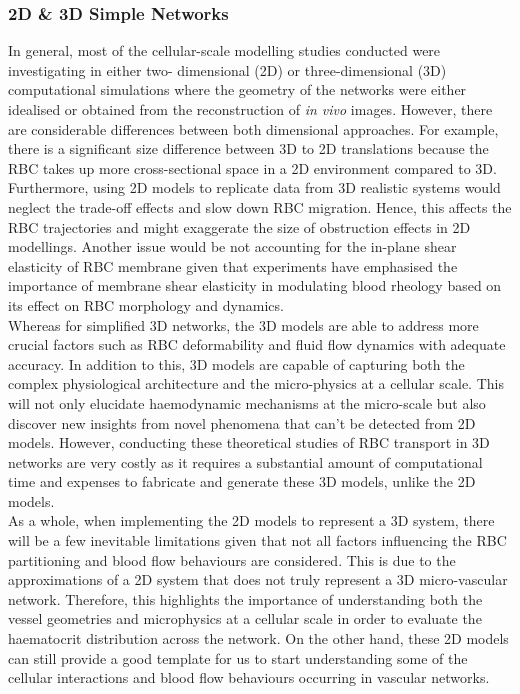 \subsubsection{2D \& 3D Simple Networks}
\noindent In general, most of the cellular-scale modelling studies conducted were investigating in either two- dimensional (2D) or three-dimensional (3D) computational simulations where the geometry of the networks were either idealised or obtained from the reconstruction of \textit{in vivo} images.\cite{PriesAR1990BFiM, reichold2011cerebral, Gould2015HematocritNetworks, Balogh2018, CharlesPhDThesis2020} However, there are considerable differences between both dimensional approaches. For example, there is a significant size difference between 3D to 2D translations because the RBC takes up more cross-sectional space in a 2D environment compared to 3D. Furthermore, using 2D models to replicate data from 3D realistic systems would neglect the trade-off effects and slow down RBC migration.\cite{Barber2011SimulatedPartitioning} Hence, this affects the RBC trajectories and might exaggerate the size of obstruction effects in 2D modellings.\cite{Xiong2012Two-dimensionalEffects} Another issue would be not accounting for the in-plane shear elasticity of RBC membrane given that experiments have emphasised the importance of membrane shear elasticity in modulating blood rheology based on its effect on RBC morphology and dynamics.\cite{PhysRevLett2018} \\

\noindent Whereas for simplified 3D networks, the 3D models are able to address more crucial factors such as RBC deformability and fluid flow dynamics with adequate accuracy. In addition to this, 3D models are capable of capturing both the complex physiological architecture and the micro-physics at a cellular scale. This will not only elucidate haemodynamic mechanisms at the micro-scale but also discover new insights from novel phenomena that can't be detected from 2D models.\cite{Balogh2017DirectNetworks} However, conducting these theoretical studies of RBC transport in 3D networks are very costly as it requires a substantial amount of computational time and expenses to fabricate and generate these 3D models, unlike the 2D models.\cite{KRUGER20113485, Zavodszky2017, BaloghPeter2019} \\


\noindent As a whole, when implementing the 2D models to represent a 3D system, there will be a few inevitable limitations given that not all factors influencing the RBC partitioning and blood flow behaviours are considered. This is due to the approximations of a 2D system that does not truly represent a 3D micro-vascular network. Therefore, this highlights the importance of understanding both the vessel geometries and microphysics at a cellular scale in order to evaluate the haematocrit distribution across the network. On the other hand, these 2D models can still provide a good template for us to start understanding some of the cellular interactions and blood flow behaviours occurring in vascular networks.


